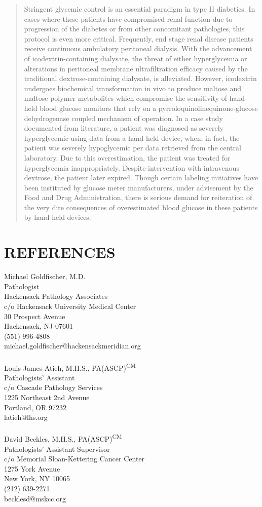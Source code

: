 \documentclass[margin]{res}
\begin{document}
\begin{resume}
\begin{quote}
Stringent glycemic control is an essential paradigm in type II diabetics.  In cases where these patients have compromised renal function due to progression of the diabetes or from other concomitant pathologies, this protocol is even more critical.  Frequently, end stage renal disease patients receive continuous ambulatory peritoneal dialysis.  With the advancement of icodextrin-containing dialysate, the threat of either hyperglycemia or alterations in peritoneal membrane ultrafiltration efficacy caused by the traditional dextrose-containing dialysate, is alleviated.  However, icodextrin undergoes biochemical transformation in vivo to produce maltose and maltose polymer metabolites which compromise the sensitivity of hand-held blood glucose monitors that rely on a pyrroloquinolinequinone-glucose dehydrogenase coupled mechanism of operation.  In a case study documented from literature, a patient was diagnosed as severely hyperglycemic using data from a hand-held device, when, in fact, the patient was severely hypoglycemic per data retrieved from the central laboratory.  Due to this overestimation, the patient was treated for hyperglycemia inappropriately.  Despite intervention with intravenous dextrose, the patient later expired.  Though certain labeling initiatives have been instituted by glucose meter manufacturers, under advisement by the Food and Drug Administration, there is serious demand for reiteration of the very dire consequences of overestimated blood glucose in these patients by hand-held devices.
\end{quote}
\section{REFERENCES}
Michael Goldfischer, M.D.\\
Pathologist\\
Hackensack Pathology Associates\\
c/o Hackensack University Medical Center\\
30 Prospect Avenue\\
Hackensack, NJ 07601\\
(551) 996-4808\\
michael.goldfischer@hackensackmeridian.org\\
\\
Louis James Atieh, M.H.S., PA(ASCP)\textsuperscript{CM} \\
Pathologists’ Assistant\\
c/o Cascade Pathology Services\\
1225 Northeast 2nd Avenue\\
Portland, OR 97232\\
latieh@lhs.org\\
\\
David Beckles, M.H.S., PA(ASCP)\textsuperscript{CM}\\
Pathologists’ Assistant Supervisor\\
c/o Memorial Sloan-Kettering Cancer Center\\
1275 York Avenue\\
New York, NY 10065\\
(212) 639-2271\\
becklesd@mskcc.org

\end{resume}
\end{document}

